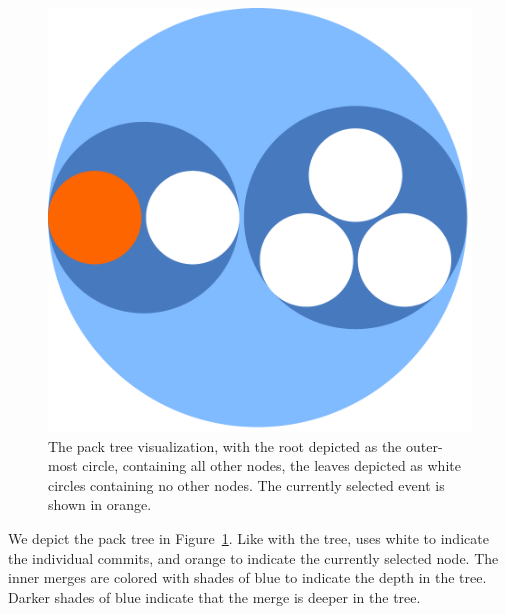 \begin{figure}[htpb]
  \centering
  \includegraphics[width=0.8\linewidth]{figures/linvis/linvis_bubble.pdf}
  \caption{The pack tree visualization, with the root depicted as the
    outer-most circle, containing all other nodes, the leaves depicted
    as white circles containing no other nodes. The currently selected
    event is shown in orange.}
  \label{fig:linvis_pack}
\end{figure}

We depict the pack tree in Figure~\ref{fig:linvis_pack}. Like with the
\rt tree, \tool uses white to indicate the individual commits, and
orange to indicate the currently selected node. The inner merges are
colored with shades of blue to indicate the depth in the tree. Darker
shades of blue indicate that the merge is deeper in the tree.
